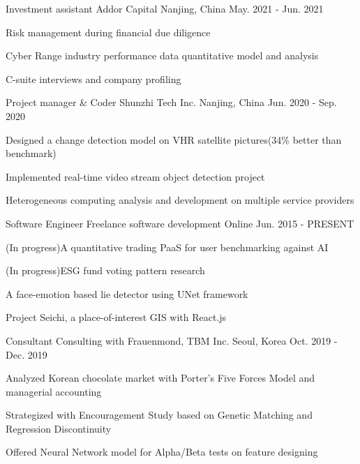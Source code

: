 \begin{cventries}
  \cventry
    {Investment assistant}
    {Addor Capital}
    {Nanjing, China}
    {May. 2021 - Jun. 2021}
    {
      \begin{cvitems}
        \item {Risk management during financial due diligence}
        \item {Cyber Range industry performance data quantitative model and  analysis}
        \item {C-suite interviews and company profiling}
      \end{cvitems}
    }



  \cventry
    {Project manager \& Coder}
    {Shunzhi Tech Inc.}
    {Nanjing, China}
    {Jun. 2020 - Sep. 2020}
    {
      \begin{cvitems}
        \item {Designed a change detection model on VHR satellite pictures(34\% better than benchmark)}
        \item {Implemented real-time video stream object detection project}
        \item {Heterogeneous computing analysis and development on multiple service providers}
      \end{cvitems}
    }

  \cventry
    {Software Engineer}
    {Freelance software development}
    {Online}
    {Jun. 2015 - PRESENT}
    {
      \begin{cvitems}
        \item {(In progress)A quantitative trading PaaS for user benchmarking against AI}
        \item {(In progress)ESG fund voting pattern research}
        \item {A face-emotion based lie detector using UNet framework}
        \item {Project Seichi, a place-of-interest GIS with React.js}
      \end{cvitems}
    }

  \cventry
    {Consultant}
    {Consulting with Frauenmond, TBM Inc.}
    {Seoul, Korea}
    {Oct. 2019 - Dec. 2019}
    {
      \begin{cvitems}
        \item {Analyzed Korean chocolate market with Porter's Five Forces Model and managerial accounting}
        \item {Strategized with Encouragement Study based on Genetic Matching and Regression Discontinuity}
        \item {Offered Neural Network model for Alpha/Beta tests on feature designing}
      \end{cvitems}
    }


\end{cventries}
